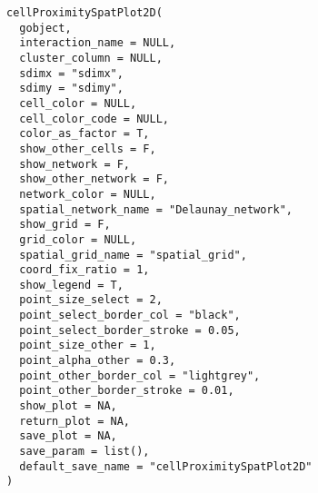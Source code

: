 \documentclass[a4paper]{book}
\begin{document}
%
\begin{Usage}
\begin{verbatim}
cellProximitySpatPlot2D(
  gobject,
  interaction_name = NULL,
  cluster_column = NULL,
  sdimx = "sdimx",
  sdimy = "sdimy",
  cell_color = NULL,
  cell_color_code = NULL,
  color_as_factor = T,
  show_other_cells = F,
  show_network = F,
  show_other_network = F,
  network_color = NULL,
  spatial_network_name = "Delaunay_network",
  show_grid = F,
  grid_color = NULL,
  spatial_grid_name = "spatial_grid",
  coord_fix_ratio = 1,
  show_legend = T,
  point_size_select = 2,
  point_select_border_col = "black",
  point_select_border_stroke = 0.05,
  point_size_other = 1,
  point_alpha_other = 0.3,
  point_other_border_col = "lightgrey",
  point_other_border_stroke = 0.01,
  show_plot = NA,
  return_plot = NA,
  save_plot = NA,
  save_param = list(),
  default_save_name = "cellProximitySpatPlot2D"
)
\end{verbatim}
\end{Usage}
%
\end{document}
